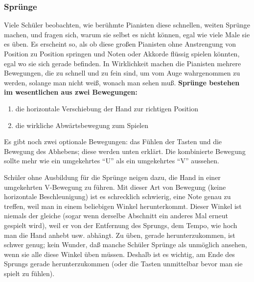 
\subsubsection{Sprünge}
\label{c1iii7f}

Viele Schüler beobachten, wie berühmte Pianisten diese schnellen, weiten Sprünge machen, und fragen sich, warum sie selbst es nicht können, egal wie viele Male sie es üben.
Es erscheint so, als ob diese großen Pianisten ohne Anstrengung von Position zu Position springen und Noten oder Akkorde flüssig spielen könnten, egal wo sie sich gerade befinden.
In Wirklichkeit machen die Pianisten mehrere Bewegungen, die zu schnell und zu fein sind, um vom Auge wahrgenommen zu werden, solange man nicht weiß, wonach man sehen muß.
\textbf{Sprünge bestehen im wesentlichen aus zwei Bewegungen:}

\begin{enumerate}[label={\arabic*.}] 
 \item die horizontale Verschiebung der Hand zur richtigen Position
 \item die wirkliche Abwärtsbewegung zum Spielen
 \end{enumerate}
Es gibt noch zwei optionale Bewegungen: das Fühlen der Tasten und die Bewegung des Abhebens; diese werden unten erklärt.
Die kombinierte Bewegung sollte mehr wie ein umgekehrtes \enquote{U} als ein umgekehrtes \enquote{V} aussehen.

Schüler ohne Ausbildung für die Sprünge neigen dazu, die Hand in einer umgekehrten V-Bewegung zu führen.
Mit dieser Art von Bewegung (keine horizontale Beschleunigung) ist es schrecklich schwierig, eine Note genau zu treffen, weil man in einem beliebigen Winkel herunterkommt.
Dieser Winkel ist niemals der gleiche (sogar wenn derselbe Abschnitt ein anderes Mal erneut gespielt wird), weil er von der Entfernung des Sprungs, dem Tempo, wie hoch man die Hand anhebt usw. abhängt.
Zu üben, gerade herunterzukommen, ist schwer genug; kein Wunder, daß manche Schüler Sprünge als unmöglich ansehen, wenn sie alle diese Winkel üben müssen.
Deshalb ist es wichtig, am Ende des Sprungs gerade herunterzukommen (oder die Tasten unmittelbar bevor man sie spielt zu fühlen).

